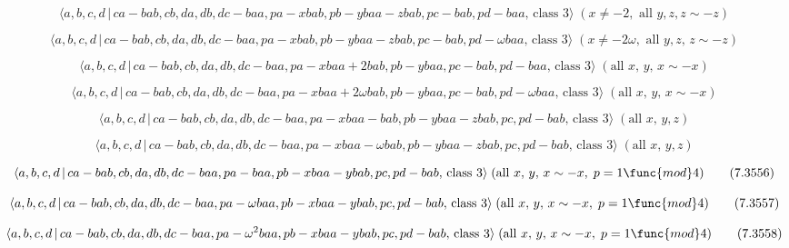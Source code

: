 \documentclass[10pt]{article}
\begin{document}
\begin{equation}
\langle
a,b,c,d\,|\,ca-bab,cb,da,db,dc-baa,pa-xbab,pb-ybaa-zbab,pc-bab,pd-baa,\,%
\text{class }3\rangle \;(x\neq -2,\text{ all }y,z,z\sim -z)  \tag{7.3550}
\end{equation}

\begin{equation}
\langle
a,b,c,d\,|\,ca-bab,cb,da,db,dc-baa,pa-xbab,pb-ybaa-zbab,pc-bab,pd-\omega
baa,\,\text{class }3\rangle \;(x\neq -2\omega ,\text{ all }y,z,\,z\sim -z) 
\tag{7.3551}
\end{equation}

\begin{equation}
\langle
a,b,c,d\,|\,ca-bab,cb,da,db,dc-baa,pa-xbaa+2bab,pb-ybaa,pc-bab,pd-baa,\,%
\text{class }3\rangle \;(\text{all }x,\,y,\,x\sim -x)  \tag{7.3552}
\end{equation}

\begin{equation}
\langle a,b,c,d\,|\,ca-bab,cb,da,db,dc-baa,pa-xbaa+2\omega
bab,pb-ybaa,pc-bab,pd-\omega baa,\,\text{class }3\rangle \;(\text{all }%
x,\,y,\,x\sim -x)  \tag{7.3553}
\end{equation}

\begin{equation}
\langle
a,b,c,d\,|\,ca-bab,cb,da,db,dc-baa,pa-xbaa-bab,pb-ybaa-zbab,pc,pd-bab,\,%
\text{class }3\rangle \;(\text{all }x,\,y,z)  \tag{7.3554}
\end{equation}

\begin{equation}
\langle a,b,c,d\,|\,ca-bab,cb,da,db,dc-baa,pa-xbaa-\omega
bab,pb-ybaa-zbab,pc,pd-bab,\,\text{class }3\rangle \;(\text{all }x,\,y,z) 
\tag{7.3555}
\end{equation}

\begin{equation}
\langle a,b,c,d\,|\,ca-bab,cb,da,db,dc-baa,pa-baa,pb-xbaa-ybab,pc,pd-bab,\,%
\text{class }3\rangle \;(\text{all }x,\,y,\,x\sim -x,\;p=1\func{mod}4) 
\tag{7.3556}
\end{equation}

\begin{equation}
\langle a,b,c,d\,|\,ca-bab,cb,da,db,dc-baa,pa-\omega
baa,pb-xbaa-ybab,pc,pd-bab,\,\text{class }3\rangle \;(\text{all }%
x,\,y,\,x\sim -x,\;p=1\func{mod}4)  \tag{7.3557}
\end{equation}

\begin{equation}
\langle a,b,c,d\,|\,ca-bab,cb,da,db,dc-baa,pa-\omega
^{2}baa,pb-xbaa-ybab,pc,pd-bab,\,\text{class }3\rangle \;(\text{all }%
x,\,y,\,x\sim -x,\;p=1\func{mod}4)  \tag{7.3558}
\end{equation}
\end{document}
